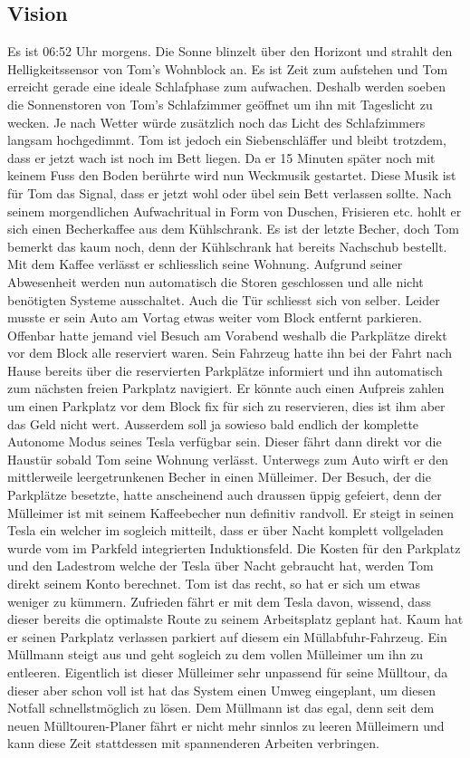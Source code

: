   \subsection{Vision}
  Es ist 06:52 Uhr morgens. Die Sonne blinzelt über den Horizont und strahlt den Helligkeitssensor von Tom's Wohnblock an. Es ist Zeit zum aufstehen und Tom erreicht gerade eine ideale Schlafphase zum aufwachen. Deshalb werden soeben die Sonnenstoren von Tom's Schlafzimmer geöffnet um ihn mit Tageslicht zu wecken. Je nach Wetter würde zusätzlich noch das Licht des Schlafzimmers langsam hochgedimmt. Tom ist jedoch ein Siebenschläffer und bleibt trotzdem, dass er jetzt wach ist noch im Bett liegen. Da er 15 Minuten später noch mit keinem Fuss den Boden berührte wird nun Weckmusik gestartet. Diese Musik ist für Tom das Signal, dass er jetzt wohl oder übel sein Bett verlassen sollte.  Nach seinem morgendlichen Aufwachritual in Form von Duschen, Frisieren etc. hohlt er sich einen Becherkaffee aus dem Kühlschrank. Es ist der letzte Becher, doch Tom bemerkt das kaum noch, denn der Kühlschrank hat bereits Nachschub bestellt. Mit dem Kaffee verlässt er schliesslich seine Wohnung. Aufgrund seiner Abwesenheit werden nun automatisch die Storen geschlossen und alle nicht benötigten Systeme ausschaltet. Auch die Tür schliesst sich von selber. Leider musste er sein Auto am Vortag etwas weiter vom Block entfernt parkieren. Offenbar hatte jemand viel Besuch am Vorabend weshalb die Parkplätze direkt vor dem Block alle reserviert waren. Sein Fahrzeug hatte ihn bei der Fahrt nach Hause bereits über die reservierten Parkplätze informiert und ihn automatisch zum nächsten freien Parkplatz navigiert. Er könnte auch einen Aufpreis zahlen um einen Parkplatz vor dem Block fix für sich zu reservieren, dies ist ihm aber das Geld nicht wert. Ausserdem soll ja sowieso bald endlich der komplette Autonome Modus seines Tesla verfügbar sein. Dieser fährt dann direkt vor die Haustür sobald Tom seine Wohnung verlässt. Unterwegs zum Auto wirft er den mittlerweile leergetrunkenen Becher in einen Mülleimer. Der Besuch, der die Parkplätze besetzte, hatte anscheinend auch draussen üppig gefeiert, denn der Mülleimer ist mit seinem Kaffeebecher nun definitiv randvoll. Er steigt in seinen Tesla ein welcher im sogleich mitteilt, dass er über Nacht komplett vollgeladen wurde vom im Parkfeld integrierten Induktionsfeld. Die Kosten für den Parkplatz und den Ladestrom welche der Tesla über Nacht gebraucht hat, werden Tom direkt seinem Konto berechnet. Tom ist das recht, so hat er sich um etwas weniger zu kümmern. Zufrieden fährt er mit dem Tesla davon, wissend, dass dieser bereits die optimalste Route zu seinem Arbeitsplatz geplant hat. Kaum hat er seinen Parkplatz verlassen parkiert auf diesem ein Müllabfuhr-Fahrzeug. Ein Müllmann steigt aus und geht sogleich zu dem vollen Mülleimer um ihn zu entleeren. Eigentlich ist dieser Mülleimer sehr unpassend für seine Mülltour, da dieser aber schon voll ist hat das System einen Umweg eingeplant, um diesen \glqq{}Notfall\grqq{} schnellstmöglich zu lösen. Dem Müllmann ist das egal, denn seit dem neuen Mülltouren-Planer fährt er nicht mehr sinnlos zu leeren Mülleimern und kann diese Zeit stattdessen mit spannenderen Arbeiten verbringen.
\fi